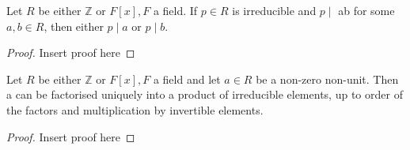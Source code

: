 \begin{lemma}
  Let \(R\) be either \(\mathbb{Z}\) or \(F[x], F\) a field. If \(p \in R\) is irreducible and \(p \mid\) ab for some \(a, b \in R\), then either \(p \mid a\) or \(p \mid b\).
\end{lemma}

\begin{proof}
  Insert proof here
\end{proof}

\begin{theorem}
 Let \(R\) be either \(\mathbb{Z}\) or \(F[x], F\) a field and let \(a \in R\) be a non-zero non-unit. Then a can be factorised uniquely into a product of irreducible elements, up to order of the factors and multiplication by invertible elements. 
\end{theorem}

\begin{proof}
  Insert proof here
\end{proof} 


